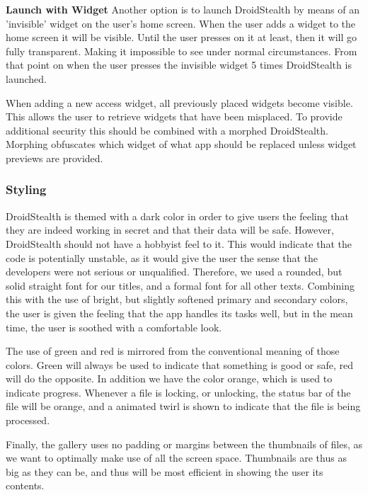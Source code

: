 \textbf{Launch with Widget}
Another option is to launch DroidStealth by means of an 'invisible' widget on the user's home screen. 
When the user adds a widget to the home screen it will be visible.
Until the user presses on it at least, then it will go fully transparent.
Making it impossible to see under normal circumstances.
From that point on when the user presses the invisible widget 5 times DroidStealth is launched.

When adding a new access widget, all previously placed widgets become visible. 
This allows the user to retrieve widgets that have been misplaced.
To provide additional security this should be combined with a morphed DroidStealth.
Morphing obfuscates which widget of what app should be replaced unless widget previews are provided.

\subsubsection{Styling}
DroidStealth is themed with a dark color in order to give users the feeling that they are indeed
working in secret and that their data will be safe. However, DroidStealth should not
have a hobbyist feel to it. This would indicate that the code is potentially unstable, 
as it would give the user the sense that the developers were not serious or unqualified. 
Therefore, we used a rounded, but solid straight font for our titles, and a formal font for 
all other texts. Combining this with the use of bright, but slightly softened primary and 
secondary colors, the user is given the feeling that the app handles its tasks well, but in 
the mean time, the user is soothed with a comfortable look. %

The use of green and red is mirrored from the conventional meaning of those colors. Green %
will always be used to indicate that something is good or safe, red will do the opposite. 
In addition we have the color orange, which is used to indicate progress. Whenever a file is 
locking, or unlocking, the status bar of the file will be orange, and a animated twirl is shown 
to indicate that the file is being processed. %

Finally, the gallery uses no padding or margins between the thumbnails of files, as we want %
to optimally make use of all the screen space. Thumbnails are thus as big as they can be, 
and thus will be most efficient in showing the user its contents. 
